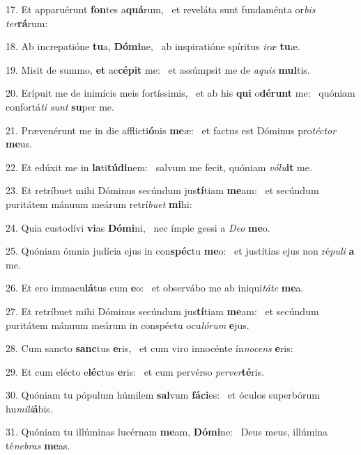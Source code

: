 17. Et apparuérunt \textbf{fon}tes a\textbf{quá}rum, \ast\  et reveláta sunt fundaménta or\textit{bis} \textit{ter}\textbf{rá}rum:\

18. Ab increpatióne \textbf{tu}a, \textbf{Dó}\textbf{mi}ne, \ast\  ab inspiratióne spíritus \textit{i}\textit{ræ} \textbf{tu}æ.\

19. Misit de summo, \textbf{et} ac\textbf{cé}\textbf{pit} me: \ast\  et assúmpsit me de \textit{a}\textit{quis} \textbf{mul}tis.\

20. Erípuit me de inimícis meis fortíssimis, \dag\  et ab his \textbf{qui} o\textbf{dé}\textbf{runt} me: \ast\  quóniam confortá\textit{ti} \textit{sunt} \textbf{su}per me.\

21. Prævenérunt me in die afflicti\textbf{ó}nis \textbf{me}æ: \ast\  et factus est Dóminus pro\textit{téc}\textit{tor} \textbf{me}us.\

22. Et edúxit me in \textbf{la}ti\textbf{tú}\textbf{di}nem: \ast\  salvum me fecit, quóniam \textit{vó}\textit{lu}\textbf{it} me.\

23. Et retríbuet mihi Dóminus secúndum jus\textbf{tí}tiam \textbf{me}am: \ast\  et secúndum puritátem mánuum meárum retrí\textit{bu}\textit{et} \textbf{mi}hi:\

24. Quia custodívi \textbf{vi}as \textbf{Dó}\textbf{mi}ni, \ast\  nec ímpie gessi a \textit{De}\textit{o} \textbf{me}o.\

25. Quóniam ómnia judícia ejus in con\textbf{spéc}tu \textbf{me}o: \ast\  et justítias ejus non ré\textit{pu}\textit{li} \textbf{a} me.\

26. Et ero immacu\textbf{lá}tus cum \textbf{e}o: \ast\  et observábo me ab iniqui\textit{tá}\textit{te} \textbf{me}a.\

27. Et retríbuet mihi Dóminus secúndum jus\textbf{tí}tiam \textbf{me}am: \ast\  et secúndum puritátem mánuum meárum in conspéctu ocu\textit{ló}\textit{rum} \textbf{e}jus.\

28. Cum sancto \textbf{sanc}tus \textbf{e}ris, \ast\  et cum viro innocénte ín\textit{no}\textit{cens} \textbf{e}ris:\

29. Et cum elécto e\textbf{léc}tus \textbf{e}ris: \ast\  et cum pervérso \textit{per}\textit{ver}\textbf{té}ris.\

30. Quóniam tu pópulum húmilem \textbf{sal}vum \textbf{fá}\textbf{ci}es: \ast\  et óculos superbórum hu\textit{mi}\textit{li}\textbf{á}bis.\

31. Quóniam tu illúminas lucérnam \textbf{me}am, \textbf{Dó}\textbf{mi}ne: \ast\  Deus meus, illúmina té\textit{ne}\textit{bras} \textbf{me}as.\

